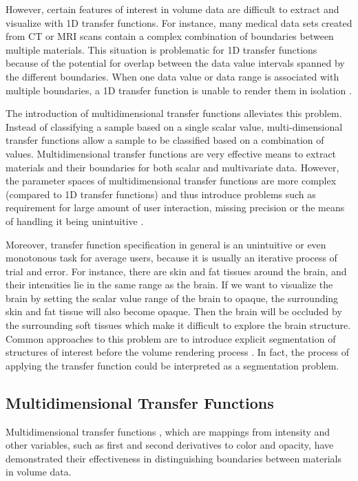 However, certain features of interest in volume data are difficult to extract and visualize with 1D transfer functions. For instance, many medical data sets created from CT or MRI scans contain a complex combination of boundaries between multiple materials. This situation is problematic for 1D transfer functions because of the potential for overlap between the data value intervals spanned by the different boundaries. When one data value or data range is associated with multiple boundaries, a 1D transfer function is unable to render them in isolation \cite{kniss_multidimensional_2002}.

The introduction of multidimensional transfer functions alleviates this problem.
Instead of classifying a sample based on a single scalar value, multi-dimensional transfer functions allow a sample to be classified based on a combination of values.
Multidimensional transfer functions are very effective means to extract materials and their boundaries for both scalar and multivariate data. However, the parameter spaces of multidimensional transfer functions are more complex (compared to 1D transfer functions) and thus introduce problems such as requirement for large amount of user interaction, missing precision or the means of handling it being unintuitive \cite{arens_survey_2010}.

Moreover, transfer function specification in general is an unintuitive or even monotonous task for average users, because it is usually an iterative process of trial and error.
For instance, there are skin and fat tissues around the brain, and their intensities lie in the same range as the brain. If we want to visualize the brain by setting the scalar value range of the brain to opaque, the surrounding skin and fat tissue will also become opaque. Then the brain will be occluded by the surrounding soft tissues which make it difficult to explore the brain structure.
Common approaches to this problem are to introduce explicit segmentation of structures of interest before the volume rendering process \cite{rezk-salama_opacity_2006}. In fact, the process of applying the transfer function could be interpreted as a segmentation problem.

\subsection{Multidimensional Transfer Functions}
Multidimensional transfer functions \cite{kniss_interactive_2001}, which are mappings from intensity and other variables, such as first and second derivatives to color and opacity, have demonstrated their effectiveness in distinguishing boundaries between materials in volume data.

